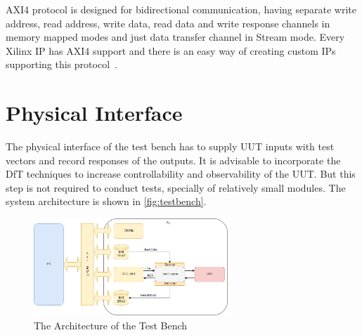 AXI4 protocol is designed for bidirectional communication, having separate write address, read address, write data, read data and write response channels in memory mapped modes and just data transfer channel in Stream mode. Every Xilinx IP has AXI4 support and there is an easy way of creating custom IPs supporting this protocol~\cite{report:AXI}.

\section{Physical Interface}
The physical interface of the test bench has to supply UUT inputs with test vectors and record responses of the outputs. It is advisable to incorporate the DfT techniques to increase controllability and observability of the UUT. But this step is not required to conduct tests, specially of relatively small modules. The system architecture is shown in \autoref{fig:testbench}.

\begin{figure}[H]
\centering
\includegraphics[width=0.65\textwidth]{figures/TestBench.png}
\caption{The Architecture of the Test Bench~\cite{book:ZynqBook}}
\label{fig:testbench}
\end{figure}


